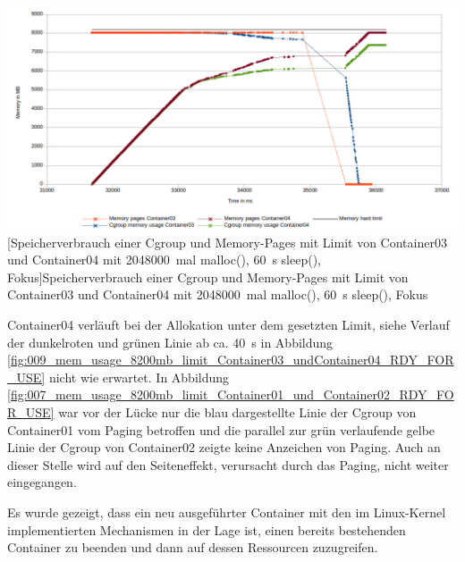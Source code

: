 \vspace{1em}
\begin{minipage}{\linewidth}
	\centering
	\includegraphics[width=1\linewidth]{pics/010_mem_usage_8200mb_limit_Container03_undContainer04_RDY_FOR_USE_Focus.png}
	[Speicherverbrauch einer Cgroup und Memory-Pages mit Limit von Container03 und Container04 mit \SI{2048000}{mal} malloc(), \SI{60}{\second} sleep(), Fokus]{Speicherverbrauch einer Cgroup und Memory-Pages mit Limit von Container03 und Container04 mit \SI{2048000}{mal} malloc(), \SI{60}{\second} sleep(), Fokus}
	\label{fig:010_mem_usage_8200mb_limit_Container03_undContainer04_RDY_FOR_USE_Focu}
\end{minipage}
\vspace{1em}

Container04 verläuft bei der Allokation unter dem gesetzten Limit, siehe Verlauf der dunkelroten und grünen Linie ab ca. \SI{40}{\second} in Abbildung \ref{fig:009_mem_usage_8200mb_limit_Container03_undContainer04_RDY_FOR_USE} nicht wie erwartet. In Abbildung \ref{fig:007_mem_usage_8200mb_limit_Container01_und_Container02_RDY_FOR_USE} war vor der Lücke nur die blau dargestellte Linie der Cgroup von Container01 vom Paging betroffen und die parallel zur grün verlaufende gelbe Linie der Cgroup von Container02 zeigte keine Anzeichen von Paging. Auch an dieser Stelle wird auf den Seiteneffekt, verursacht durch das Paging, nicht weiter eingegangen.

Es wurde gezeigt, dass ein neu ausgeführter Container mit den im Linux-Kernel implementierten Mechanismen in der Lage ist, einen bereits bestehenden Container zu beenden und dann auf dessen Ressourcen zuzugreifen.


